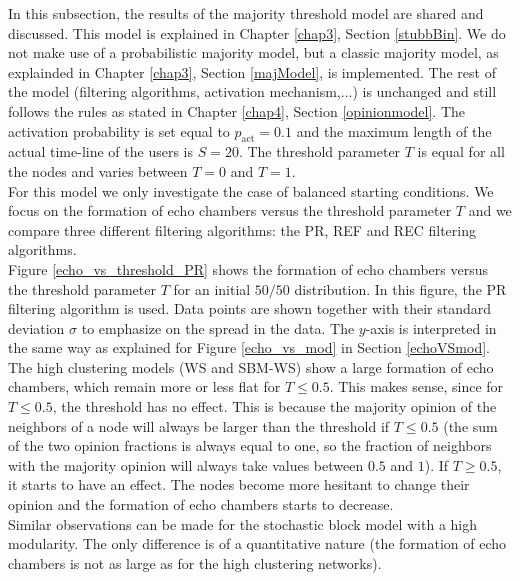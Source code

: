 \documentclass[11 pt , letterpaper , twoside , openright]{book}
\begin{document}
In this subsection, the results of the majority threshold model are shared and discussed. This model is explained in Chapter \ref{chap3}, Section \ref{stubbBin}. We do not make use of a probabilistic majority model, but a classic majority model, as explainded in Chapter \ref{chap3}, Section \ref{majModel}, is implemented. The rest of the model (filtering algorithms, activation mechanism,...) is unchanged and still follows the rules as stated in Chapter \ref{chap4}, Section \ref{opinionmodel}. The activation probability is set equal to $p_{\text{act}} = 0.1$ and the maximum length of the actual time-line of the users is $S=20$. The threshold parameter $T$ is equal for all the nodes and varies between $T=0$ and $T=1$.\\
\newline
For this model we only investigate the case of balanced starting conditions. We focus on the formation of echo chambers versus the threshold parameter $T$ and we compare three different filtering algorithms: the PR, REF and REC filtering algorithms. \\
\newline
Figure \ref{echo_vs_threshold_PR} shows the formation of echo chambers versus the threshold parameter $T$ for an initial $50/50$ distribution. In this figure, the PR filtering algorithm is used. Data points are shown together with their standard deviation $\sigma$ to emphasize on the spread in the data. The $y$-axis is interpreted in the same way as explained for Figure \ref{echo_vs_mod} in Section \ref{echoVSmod}.\\
\newline
The high clustering models (WS and SBM-WS) show a large formation of echo chambers, which remain more or less flat for $T \leqslant 0.5$. This makes sense, since for $T \leqslant 0.5$, the threshold has no effect. This is because the majority opinion of the neighbors of a node will always be larger than the threshold if $T \leqslant 0.5$ (the sum of the two opinion fractions is always equal to one, so the fraction of neighbors with the majority opinion will always take values between $0.5$ and $1$). If $T \geqslant 0.5$, it starts to have an effect. The nodes become more hesitant to change their opinion and the formation of echo chambers starts to decrease.\\
\newline
Similar observations can be made for the stochastic block model with a high modularity. The only difference is of a quantitative nature (the formation of echo chambers is not as large as for the high clustering networks).\\
\end{document}
